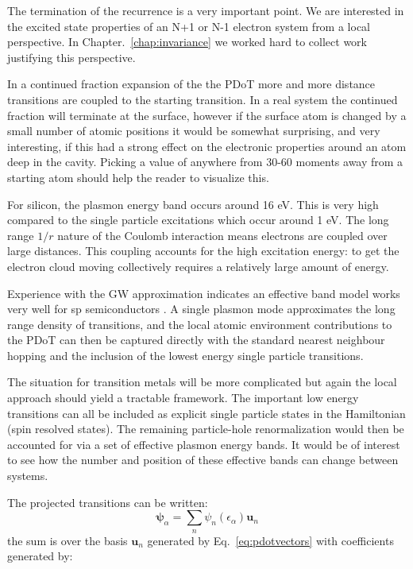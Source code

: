 The termination of the recurrence is a very important point. 
We are interested in the excited state properties of an N+1 or N-1 electron system
from a local perspective. In Chapter.~\ref{chap:invariance} we worked hard to collect work
justifying this perspective. 

In a continued fraction expansion of the the PDoT more and more distance transitions are coupled
to the starting transition. In a real system the continued fraction will terminate at the surface,
however if the surface atom is changed by a small number of atomic positions it would
be somewhat surprising, and very interesting, if this had a strong effect on the electronic
properties around an atom deep in the cavity. Picking a value of anywhere from 30-60 moments 
away from a starting atom should help the reader to visualize this.

For silicon, the plasmon energy band occurs around 16 eV. This is very high compared
to the single particle excitations which occur around 1 eV. The long range $1/r$ nature of the Coulomb
interaction means electrons are coupled over large distances.
This coupling accounts for the high excitation energy: to get the
electron cloud moving collectively requires a relatively large amount of energy.

Experience with the GW approximation indicates an effective band model works very well
for sp semiconductors \cite{godbyneeds, hybertsenlouie, bergstressen}. 
A single plasmon mode approximates the long range density of transitions, and the local
atomic environment contributions to the PDoT can then be captured directly with the standard nearest
neighbour hopping and the inclusion of the lowest energy single particle transitions.

The situation for transition metals will be more complicated but again the local approach should yield 
a tractable framework. The important low energy transitions can all be included 
as explicit single particle states in the Hamiltonian (spin resolved states). 
The remaining particle-hole renormalization would then be accounted for 
via a set of effective plasmon energy bands. It would be of interest to
see how the number and position of these effective bands can change between systems.

The projected transitions can be written:
%
\begin{equation}
\mathbf{\psi}_{\alpha} = \sum_{n} \psi_{n}(\epsilon_{\alpha})\mathbf{u}_{n}
\end{equation}
%
the sum is over the basis ${\mathbf{u}_{n}}$ generated by Eq.~\ref{eq:pdotvectors}
with coefficients generated by:

